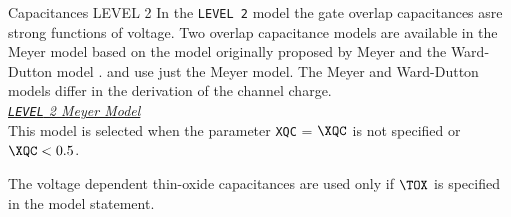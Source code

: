 {{Capacitances LEVEL 2} 
 In the {\tt LEVEL 2}
model the gate overlap capacitances asre strong functions of
voltage. Two overlap capacitance models are available in \pspice
the Meyer model based on the model originally proposed by Meyer
\cite{meyer:71} and the Ward-Dutton model
\cite{ward:dutton:78,oh:ward:80}. \spicetwo and \spicethree use
just the Meyer model. The Meyer and Ward-Dutton models differ in
the derivation of the channel charge.
\\[0.2in]
\noindent\underline{\sl \large {\tt LEVEL} 2 Meyer Model}\\[0.1in]
  
 
  This model is
selected when the parameter {\tt XQC} = $\XQC$ is not specified or
$\XQC < 0.5$.

The voltage dependent thin-oxide capacitances are used only if
$\TOX$ is specified in the model statement.

}
